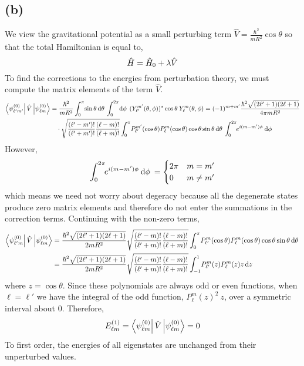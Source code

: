 \documentclass[12pt]{extarticle}
\begin{document}
\subsection*{(b)}
We view the gravitational potential as a small perturbing term $\hat{V} = \frac{\hbar^2}{mR^2} \cos{\theta}$ so that the total Hamiltonian is equal to,
\[\hat{H} = \hat{H}_0 + \lambda \hat{V}\] 
To find the corrections to the energies from perturbation theory, we must compute the matrix elements of the term $\hat{V}$. 
\begin{align*}
\left< \psi^{(0)}_{\ell' m'} \right| \hat{V} \left| \psi^{(0)}_{\ell m} \right> & = \frac{\hbar^2}{mR^2}\int_{0}^{\pi} \! \sin{\theta} \, \mathrm{d}\theta \: \int_{0}^{2 \pi} \! \mathrm{d}\phi \: \: (Y_{\ell'}^{m'}(\theta, \phi))^{*} \cos{\theta} \: Y_\ell^m(\theta, \phi) = (-1)^{m + m'} \frac{\hbar^2 \sqrt{(2 \ell' + 1) (2 \ell + 1)}}{4 \pi mR^2} \\ & \quad \cdot \sqrt{\frac{(\ell' - m')!}{(\ell' + m')!} \frac{(\ell - m)!}{(\ell + m)!}}  \int_{0}^{\pi} \! P^{m'}_{\ell'}(\cos{\theta}) P^m_\ell(\cos{\theta}) \cos{\theta} \sin{\theta} \, \mathrm{d}\theta \: \int_0^{2 \pi} \!\! e^{i (m - m')\phi} \: \mathrm{d}\phi \: 
\end{align*}
However,
\[ \int_0^{2 \pi} \!\! e^{i (m - m')\phi} \: \mathrm{d}\phi \: = 
\begin{cases} 
2 \pi & m = m' \\
0 & m \neq m'
\end{cases}\]
which means we need not worry about degeracy because all the degenerate states produce zero matrix elements and therefore do not enter the summations in the correction terms. Continuing with the non-zero terms,
\begin{align*}
\left< \psi^{(0)}_{\ell' m} \right| \hat{V} \left| \psi^{(0)}_{\ell m} \right> & = \frac{\hbar^2 \sqrt{(2 \ell' + 1) (2 \ell + 1)}}{2 mR^2} \sqrt{\frac{(\ell' - m)!}{(\ell' + m)!} \frac{(\ell - m)!}{(\ell + m)!}}  \int_{0}^{\pi} \! P^{m}_{\ell'}(\cos{\theta}) P^m_\ell(\cos{\theta}) \cos{\theta} \sin{\theta} \, \mathrm{d}\theta \: \\ 
& = \frac{\hbar^2 \sqrt{(2 \ell' + 1) (2 \ell + 1)}}{2 mR^2} \sqrt{\frac{(\ell' - m)!}{(\ell' + m)!} \frac{(\ell - m)!}{(\ell + m)!}}  \int_{-1}^{1} \! P^{m}_{\ell'}(z) P^m_\ell(z) z \, \mathrm{d}z \: 
\end{align*}
where $z = \cos{\theta}$. Since these polynomials are always odd or even functions, when $\ell = \ell'$ we have the integral of the odd function, $P^{m}_{\ell}(z)^2 \: z $, over a symmetric interval about $0$. Therefore,  
\[E^{(1)}_{\ell m} = \left< \psi^{(0)}_{\ell m} \right| \hat{V} \left| \psi^{(0)}_{\ell m} \right> = 0\]
To first order, the energies of all eigenstates are unchanged from their unperturbed values. 
\end{document}
